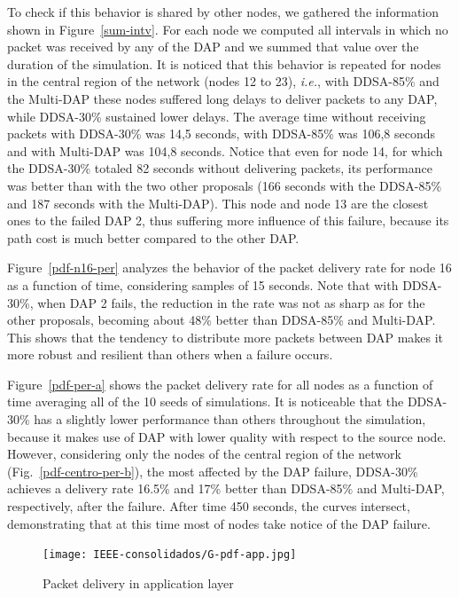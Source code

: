 \documentclass[conference]{IEEEtran}
\begin{document}
To check if this behavior is shared by other nodes, we gathered the information shown in Figure~\ref{sum-intv}. For each node we computed all intervals in which no packet was received by any of the DAP and we summed that value over the duration of the simulation. It is noticed that this behavior is repeated for nodes in the central region of the network (nodes 12 to 23), \textit{i.e.}, with DDSA-85\% and the Multi-DAP these nodes suffered long delays to deliver packets to any DAP, while DDSA-30\% sustained lower delays. The average time without receiving packets with DDSA-30\% was 14,5 seconds, with DDSA-85\% was 106,8 seconds and with Multi-DAP was 104,8 seconds. Notice that even for node 14, for which the DDSA-30\% totaled 82 seconds without delivering packets, its performance was better than with the two other proposals (166 seconds with the DDSA-85\% and 187 seconds with the Multi-DAP). This node and node 13 are the closest ones to the failed DAP 2, thus suffering more influence of this failure, because its path cost is much better compared to the other DAP.

Figure~\ref{pdf-n16-per}  analyzes the behavior of the packet delivery rate for node 16 as a function of time, considering samples of 15 seconds. Note that with DDSA-30\%, when DAP 2 fails, the reduction in the rate was not as sharp as for the other proposals, becoming about 48\% better than DDSA-85\% and Multi-DAP. This shows that the tendency to distribute more packets between DAP makes it more robust and resilient than others when a failure occurs.


Figure~\ref{pdf-per-a} shows the packet delivery rate for all nodes as a function of time averaging all of the 10 seeds of simulations. It is noticeable that the DDSA-30\% has a slightly lower performance than others throughout the simulation, because it makes use of DAP with lower quality with respect to the source node. However, considering only the nodes of the central region of the network (Fig.~\ref{pdf-centro-per-b}), the most affected by the DAP failure, DDSA-30\% achieves a delivery rate 16.5\% and 17\% better than DDSA-85\% and Multi-DAP, respectively, after the failure. After time 450 seconds, the curves intersect, demonstrating that at this time most of nodes take notice of the DAP failure.

\begin{figure}[ht]
  \centering
  \label{pdf-app1}{\texttt{[image: IEEE-consolidados/G-pdf-app.jpg]}} 
  \caption{Packet delivery in application layer}
  \label{pdf-app}
\end{figure}
\end{document}
